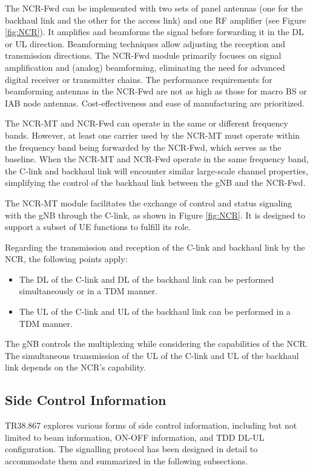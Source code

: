 \documentclass[lettersize,journal]{IEEEtran}
\begin{document}
The NCR-Fwd can be implemented with two sets of panel antennas (one for the backhaul link and the other for the access link) and one RF amplifier (see Figure \ref{fig:NCR}). It amplifies and beamforms the signal before forwarding it in the DL or UL direction. Beamforming techniques allow adjusting the reception and transmission directions. The NCR-Fwd module primarily focuses on signal amplification and (analog) beamforming, eliminating the need for advanced digital receiver or transmitter chains. The performance requirements for beamforming antennas in the NCR-Fwd are not as high as those for macro BS or IAB node antennas. Cost-effectiveness and ease of manufacturing are prioritized.

The NCR-MT and NCR-Fwd can operate in the same or different frequency bands. However, at least one carrier used by the NCR-MT must operate within the frequency band being forwarded by the NCR-Fwd, which serves as the baseline. When the NCR-MT and NCR-Fwd operate in the same frequency band, the C-link and backhaul link will encounter similar large-scale channel properties, simplifying the control of the backhaul link between the gNB and the NCR-Fwd.

The NCR-MT module facilitates the exchange of control and status signaling with the gNB through the C-link, as shown in Figure \ref{fig:NCR}. It is designed to support a subset of UE functions to fulfill its role.

Regarding the transmission and reception of the C-link and backhaul link by the NCR, the following points apply:
\begin{itemize}
\item The DL of the C-link and DL of the backhaul link can be performed simultaneously or in a TDM manner.
\item The UL of the C-link and UL of the backhaul link can be performed in a TDM manner.
\end{itemize}

The gNB controls the multiplexing while considering the capabilities of the NCR. The simultaneous transmission of the UL of the C-link and UL of the backhaul link depends on the NCR's capability.




\subsection{Side Control Information}
TR38.867 \cite{3GPP-38-867} explores various forms of side control information, including but not limited to beam information, ON-OFF information, and TDD DL-UL configuration. The signalling protocol has been designed in detail to accommodate them and summarized in the following subsections.
\end{document}
